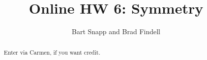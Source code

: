 \documentclass[handout,space,nooutcomes]{xourse}
\title{Online HW 6: Symmetry}
\author{Bart Snapp and Brad Findell}
\begin{document}
\begin{abstract}
Enter via Carmen, if you want credit.  
\end{abstract}
\maketitle

{}
\end{document}

